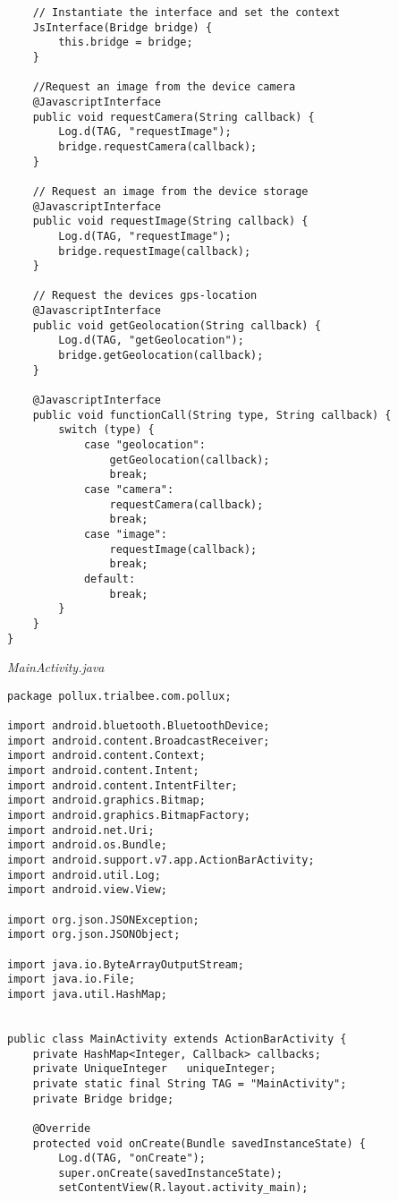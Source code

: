\begin{appendices}
\begin{lstlisting}
    // Instantiate the interface and set the context
    JsInterface(Bridge bridge) {
        this.bridge = bridge;
    }

    //Request an image from the device camera
    @JavascriptInterface
    public void requestCamera(String callback) {
        Log.d(TAG, "requestImage");
        bridge.requestCamera(callback);
    }

    // Request an image from the device storage
    @JavascriptInterface
    public void requestImage(String callback) {
        Log.d(TAG, "requestImage");
        bridge.requestImage(callback);
    }

    // Request the devices gps-location
    @JavascriptInterface
    public void getGeolocation(String callback) {
        Log.d(TAG, "getGeolocation");
        bridge.getGeolocation(callback);
    }

    @JavascriptInterface
    public void functionCall(String type, String callback) {
        switch (type) {
            case "geolocation":
                getGeolocation(callback);
                break;
            case "camera":
                requestCamera(callback);
                break;
            case "image":
                requestImage(callback);
                break;
            default:
                break;
        }
    }
}
\end{lstlisting}

\emph{MainActivity.java}
\begin{lstlisting}
package pollux.trialbee.com.pollux;

import android.bluetooth.BluetoothDevice;
import android.content.BroadcastReceiver;
import android.content.Context;
import android.content.Intent;
import android.content.IntentFilter;
import android.graphics.Bitmap;
import android.graphics.BitmapFactory;
import android.net.Uri;
import android.os.Bundle;
import android.support.v7.app.ActionBarActivity;
import android.util.Log;
import android.view.View;

import org.json.JSONException;
import org.json.JSONObject;

import java.io.ByteArrayOutputStream;
import java.io.File;
import java.util.HashMap;


public class MainActivity extends ActionBarActivity {
    private HashMap<Integer, Callback> callbacks;
    private UniqueInteger   uniqueInteger;
    private static final String TAG = "MainActivity";
    private Bridge bridge;

    @Override
    protected void onCreate(Bundle savedInstanceState) {
        Log.d(TAG, "onCreate");
        super.onCreate(savedInstanceState);
        setContentView(R.layout.activity_main);


\end{lstlisting}
\end{appendices}
